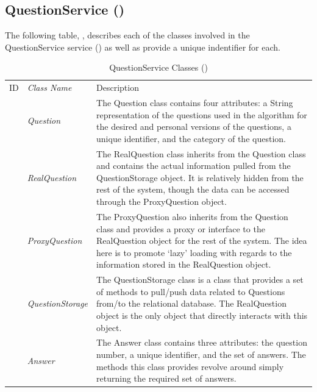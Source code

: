 \documentclass[12pt,letterpaper]{article}
\begin{document}
\subsection{QuestionService ()}

The following table, , describes each of the classes involved in the QuestionService service () as well as provide a unique indentifier for each.

\begin{table}[H]
	\caption{QuestionService Classes ()} 
	\begin{tabu} to 
	    \tableheader{}ID & Class Name & Description \\
		 & Question & The Question class contains four attributes: a String representation of the questions used in the algorithm for the desired and personal versions of the questions, a unique identifier, and the category of the question. \\
		 & RealQuestion & The RealQuestion class inherits from the Question class and contains the actual information pulled from the QuestionStorage object. It is relatively hidden from the rest of the system, though the data can be accessed through the ProxyQuestion object.\\
		 & ProxyQuestion & The ProxyQuestion also inherits from the Question class and provides a proxy or interface to the RealQuestion object for the rest of the system. The idea here is to promote `lazy' loading with regards to the information stored in the RealQuestion object.\\
		 & QuestionStorage & The QuestionStorage class is a class that provides a set of methods to pull/push data related to Questions from/to the relational database. The RealQuestion object is the only object that directly interacts with this object.\\
		 & Answer & The Answer class contains three attributes: the question number, a unique identifier, and the set of answers. The methods this class provides revolve around simply returning the required set of answers.\\
	\end{tabu}
\end{table}
\end{document}
